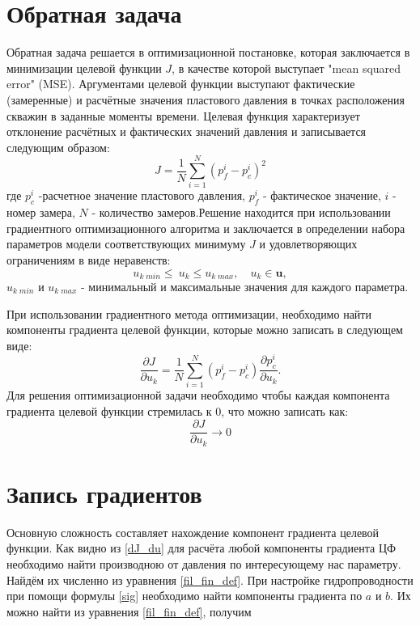 \documentclass[14pt]{article}
\begin{document}
\section{Обратная задача}
Обратная задача решается в оптимизационной постановке, которая заключается в минимизации целевой функции $J$, в качестве которой выступает "mean squared error" (MSE). Аргументами целевой функции выступают фактические (замеренные) и расчётные значения пластового давления в точках расположения скважин в заданные моменты времени. Целевая функция характеризует отклонение расчётных и фактических значений давления и записывается следующим образом:
\begin{equation} \label{mape}
J=\frac{1}{N}\sum_{i=1}^N{\left(p_f^i-p_c^i\right)^2}
\end{equation}
где $p_c^i$ -расчетное значение пластового давления, $p_f^i$ - фактическое значение, $i$ - номер замера, $N$ - количество замеров.Решение находится при использовании градиентного оптимизационного алгоритма и заключается в определении набора параметров модели соответствующих минимуму $J$ и удовлетворяющих ограничениям в виде неравенств:
\begin{equation*}
u_{k\;min}\leq\ u_k\leq u_{k\;max}, \quad u_k \in \boldsymbol{u},
\end{equation*}
$u_{k\;min}$ и $u_{k\;max}$ - минимальный и максимальные значения для каждого параметра.

При использовании градиентного метода оптимизации, необходимо найти компоненты градиента целевой функции, которые можно записать в следующем виде:
\begin{equation}\label{dJ_du}
	\frac{\partial J}{\partial u_k} = \frac{1}{N}\sum_{i=1}^N \left(p_f^i-p_c^i\right)\frac{\partial p_c^i}{\partial u_k}.
\end{equation}
Для решения оптимизационной задачи необходимо чтобы каждая компонента градиента целевой функции стремилась к 0, что можно записать как:
\begin{equation} \label{rp}
\frac{\partial J}{\partial u_k} \rightarrow 0
\end{equation}

\section{Запись градиентов}
Основную сложность составляет нахождение компонент градиента целевой функции. Как видно из \ref{dJ_du} для расчёта любой компоненты градиента ЦФ необходимо найти производною от давления по интересующему нас параметру. Найдём их численно из уравнения \ref{fil_fin_def}. При настройке гидропроводности при помощи формулы  \ref{sig} необходимо найти компоненты градиента по $ a $ и $ b $. Их можно найти из уравнения \ref{fil_fin_def}, получим
\end{document}
